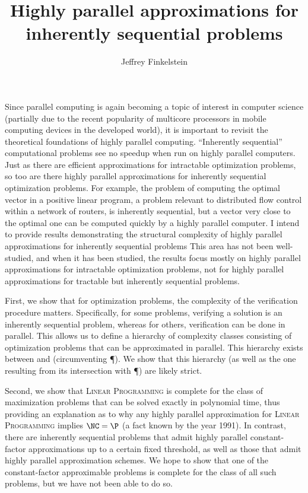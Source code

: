 \documentclass{article}
\author{Jeffrey Finkelstein}
\title{Highly parallel approximations for inherently sequential problems}
\begin{document}
\maketitle


Since parallel computing is again becoming a topic of interest in computer science (partially due to the recent popularity of multicore processors in mobile computing devices in the developed world), it is important to revisit the theoretical foundations of highly parallel computing.
``Inherently sequential'' computational problems see no speedup when run on highly parallel computers.
Just as there are efficient approximations for intractable optimization problems, so too are there highly parallel approximations for inherently sequential optimization problems.
For example, the problem of computing the optimal vector in a positive linear program, a problem relevant to distributed flow control within a network of routers, is inherently sequential, but a vector very close to the optimal one can be computed quickly by a highly parallel computer.
I intend to provide results demonstrating the structural complexity of highly parallel approximations for inherently sequential problems
This area has not been well-studied, and when it has been studied, the results focus mostly on highly parallel approximations for intractable optimization problems, not for highly parallel approximations for tractable but inherently sequential problems.


First, we show that for optimization problems, the complexity of the verification procedure matters.
Specifically, for some problems, verifying a solution is an inherently sequential problem, whereas for others, verification can be done in parallel.
This allows us to define a hierarchy of complexity classes consisting of optimization problems that can be approximated in parallel.
This hierarchy exists between \NC{} and \NP{} (circumventing \P).
We show that this hierarchy (as well as the one resulting from its intersection with \P) are likely strict.

Second, we show that \textsc{Linear Programming} is complete for the class of maximization problems that can be solved exactly in polynomial time, thus providing an explanation as to why any highly parallel approximation for \textsc{Linear Programming} implies $\NC = \P$ (a fact known by the year 1991).
In contrast, there are inherently sequential problems that admit highly parallel constant-factor approximations up to a certain fixed threshold, as well as those that admit highly parallel approximation schemes.
We hope to show that one of the constant-factor approximable problems is complete for the class of all such problems, but we have not been able to do so.
\end{document}
